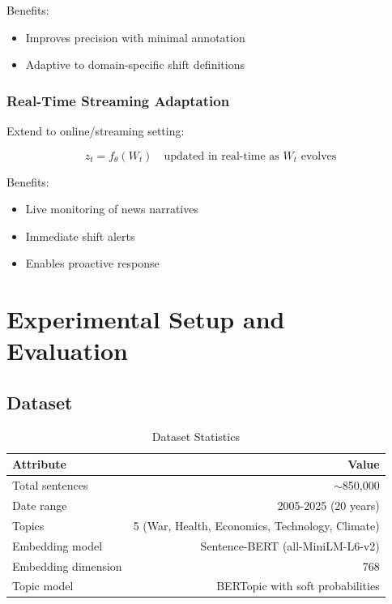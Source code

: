 \documentclass[12pt]{article}
\begin{document}
Benefits:
\begin{itemize}
    \item Improves precision with minimal annotation
    \item Adaptive to domain-specific shift definitions
\end{itemize}

\subsubsection{Real-Time Streaming Adaptation}

Extend to online/streaming setting:

\begin{equation}
z_t = f_\theta(W_t) \quad \text{updated in real-time as } W_t \text{ evolves}
\end{equation}

Benefits:
\begin{itemize}
    \item Live monitoring of news narratives
    \item Immediate shift alerts
    \item Enables proactive response
\end{itemize}

\newpage

\section{Experimental Setup and Evaluation}

\subsection{Dataset}

\begin{table}[H]
\centering
\begin{tabular}{lr}
\toprule
\textbf{Attribute} & \textbf{Value} \\
\midrule
Total sentences & $\sim$850,000 \\
Date range & 2005-2025 (20 years) \\
Topics & 5 (War, Health, Economics, Technology, Climate) \\
Embedding model & Sentence-BERT (all-MiniLM-L6-v2) \\
Embedding dimension & 768 \\
Topic model & BERTopic with soft probabilities \\
\bottomrule
\end{tabular}
\caption{Dataset Statistics}
\end{table}
\end{document}
